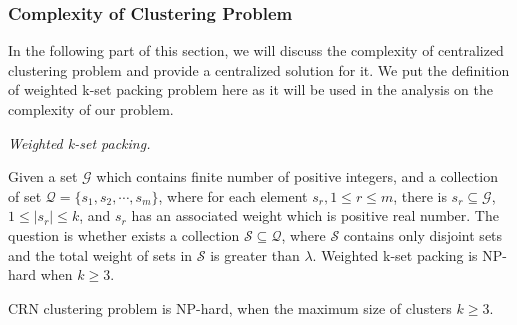 \subsubsection{Complexity of Clustering Problem}
In the following part of this section, we will discuss the complexity of centralized clustering problem and provide a centralized solution for it.
We put the definition of weighted k-set packing problem here as it will be used in the analysis on the complexity of our problem.

\begin{mydef}
\label{def_kset_packing}
\textit{Weighted k-set packing.} 

Given a set $\mathcal{G}$ which contains finite number of positive integers, and a collection of set $\mathcal{Q}=\{s_1,s_2,\cdots,s_m\}$, where for each element $s_r, 1\leq r \leq m$, there is $s_r\subseteq \mathcal{G}$, $ 1\leq|s_r| \leq k$, and $s_r$ has an associated weight which is positive real number.
The question is whether exists a collection $\mathcal{S}\subseteq \mathcal{Q}$, where $\mathcal{S}$ contains only disjoint sets and the total weight of sets in $\mathcal{S}$ is greater than $\lambda$.
Weighted k-set packing is NP-hard when $k\geqslant 3$.~\cite{Computers_a_Intractability}
\end{mydef}

\begin{theorem}
\label{theorem1}
CRN clustering problem is NP-hard, when the maximum size of clusters $k\geqslant 3$.
\end{theorem}

